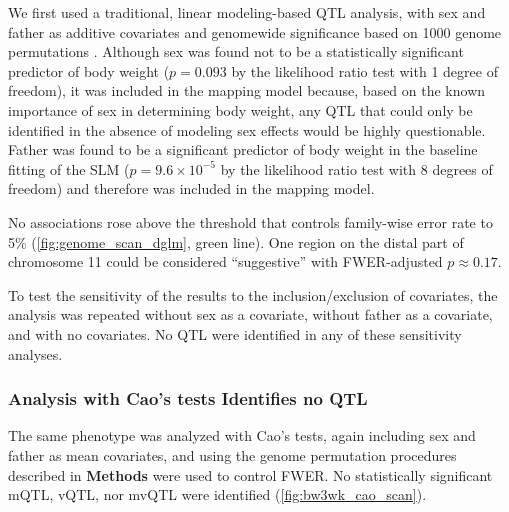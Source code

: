 We first used a traditional, linear modeling-based QTL analysis, with  sex and father as additive covariates and genomewide significance based on 1000 genome permutations \citep{Churchill1994}.
Although sex was found not to be a statistically significant predictor of body weight ($p = 0.093$ by the likelihood ratio test with 1 degree of freedom), it was included in the mapping model because, based on the known importance of sex in determining body weight, any QTL that could only be identified in the absence of modeling sex effects would be highly questionable.
Father was found to be a significant predictor of body weight in the baseline fitting of the SLM ($p = 9.6 \times 10^{-5}$ by the likelihood ratio test with 8 degrees of freedom) and therefore was included in the mapping model.

No associations rose above the threshold that controls family-wise error rate to 5\% (\autoref{fig:genome_scan_dglm}, green line).
One region on the distal part of chromosome 11 could be considered ``suggestive'' with FWER-adjusted $p \approx 0.17$.

To test the sensitivity of the results to the inclusion/exclusion of covariates, the analysis was repeated without sex as a covariate, without father as a covariate, and with no covariates.
No QTL were identified in any of these sensitivity analyses.

\subsubsection{Analysis with Cao's tests Identifies no QTL}
The same phenotype was analyzed with Cao's tests, again including sex and father as mean covariates, and using the genome permutation procedures described in \textbf{Methods} were used to control FWER.
No statistically significant mQTL, vQTL, nor mvQTL were identified (\autoref{fig:bw3wk_cao_scan}).

